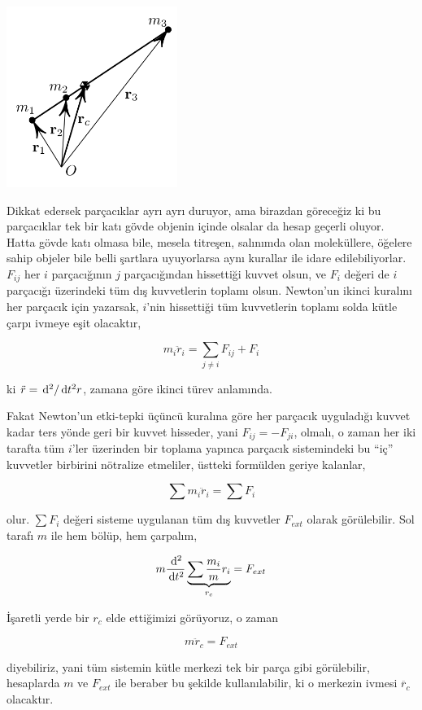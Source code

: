 \documentclass[12pt,fleqn]{article}\usepackage{../../common}
\begin{document}
\includegraphics[width=15em]{phy_005_basics_08.png}

Dikkat edersek parçacıklar ayrı ayrı duruyor, ama birazdan göreceğiz ki bu
parçacıklar tek bir katı gövde objenin içinde olsalar da hesap geçerli
oluyor. Hatta gövde katı olmasa bile, mesela titreşen, salınımda olan
moleküllere, öğelere sahip objeler bile belli şartlara uyuyorlarsa aynı kurallar
ile idare edilebiliyorlar. $F_{ij}$ her $i$ parçacığının $j$ parçacığından
hissettiği kuvvet olsun, ve $F_i$ değeri de $i$ parçacığı üzerindeki tüm dış
kuvvetlerin toplamı olsun. Newton'un ikinci kuralını her parçacık için yazarsak,
$i$'nin hissettiği tüm kuvvetlerin toplamı solda kütle çarpı ivmeye eşit
olacaktır,

$$
m_i \ddot{r}_i = \sum _{j \ne i} F_{ij} + F_i
$$

ki $\ddot{r} = \,\mathrm{d}^2 / \,\mathrm{d} t^2 r$, zamana göre ikinci türev anlamında.

Fakat Newton'un etki-tepki üçüncü kuralına göre her parçacık uyguladığı kuvvet
kadar ters yönde geri bir kuvvet hisseder, yani $F_{ij} = -F_{ji}$, olmalı, o
zaman her iki tarafta tüm $i$'ler üzerinden bir toplama yapınca parçacık
sistemindeki bu ``iç'' kuvvetler birbirini nötralize etmeliler, üstteki
formülden geriye kalanlar,

$$
\sum m_i \ddot{r}_i =  \sum F_i
$$

olur. $\sum F_i$ değeri sisteme uygulanan tüm dış kuvvetler $F_{ext}$ olarak
görülebilir. Sol tarafı $m$ ile hem bölüp, hem çarpalım,

$$
m \frac{\,\mathrm{d}^2}{\,\mathrm{d} t^2} \underbrace{\sum \frac{m_i}{m} r_i}_{r_c} =
F_{ext}
$$

İşaretli yerde bir $r_c$ elde ettiğimizi görüyoruz, o zaman 

$$
m\ddot{r}_c = F_{ext}
$$

diyebiliriz, yani tüm sistemin kütle merkezi tek bir parça gibi görülebilir,
hesaplarda $m$ ve $F_{ext}$ ile beraber bu şekilde kullanılabilir, ki
o merkezin ivmesi $\ddot{r_c}$ olacaktır.
\end{document}
